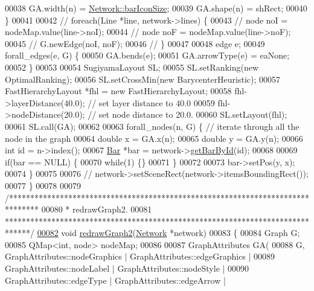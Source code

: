 \begin{DoxyCode}
00038     GA.width(n) = \hyperlink{group___graphics_gaa334bbc93b3fde219840e95e23198b53}{Network::barIconSize};
00039     GA.shape(n) = shRect;
00040   \}
00041 
00042 \textcolor{comment}{//  foreach(Line *line, network->lines) \{}
00043 \textcolor{comment}{//    node noI = nodeMap.value(line->noI);}
00044 \textcolor{comment}{//    node noF = nodeMap.value(line->noF);}
00045 \textcolor{comment}{//    G.newEdge(noI, noF);}
00046 \textcolor{comment}{//  \}}
00047 
00048   edge e;
00049   forall\_edges(e, G) \{
00050     GA.bends(e);
00051     GA.arrowType(e) = eaNone;
00052   \}
00053 
00054   SugiyamaLayout SL;
00055   SL.setRanking(\textcolor{keyword}{new} OptimalRanking);
00056   SL.setCrossMin(\textcolor{keyword}{new} BarycenterHeuristic);
00057   FastHierarchyLayout *fhl = \textcolor{keyword}{new} FastHierarchyLayout;
00058   fhl->layerDistance(40.0);    \textcolor{comment}{// set layer distance to 40.0}
00059   fhl->nodeDistance(20.0); \textcolor{comment}{// set node distance to 20.0.}
00060   SL.setLayout(fhl);
00061   SL.call(GA);
00062 
00063   forall\_nodes(n, G) \{  \textcolor{comment}{// iterate through all the node in the graph}
00064     \textcolor{keywordtype}{double} x = GA.x(n);
00065     \textcolor{keywordtype}{double} y = GA.y(n);
00066     \textcolor{keywordtype}{int} \textcolor{keywordtype}{id} = n->index();
00067     \hyperlink{class_bar}{Bar} *bar = network->\hyperlink{group___graphics_ga9c5806f5a0d236bb6d8abbdce62d9675}{getBarById}(\textcolor{keywordtype}{id});
00068 
00069     \textcolor{keywordflow}{if}(bar == NULL) \{
00070       \textcolor{keywordflow}{while}(1) \{\}
00071     \}
00072 
00073     bar->setPos(y, x);
00074   \}
00075 
00076 \textcolor{comment}{//  network->setSceneRect(network->itemsBoundingRect());}
00077 \}
00078 
00079 \textcolor{comment}{/*******************************************************************************}
00080 \textcolor{comment}{ * redrawGraph2.}
00081 \textcolor{comment}{ ******************************************************************************/}
\hypertarget{redraw_8cpp_source_l00082}{}\hyperlink{redraw_8h_ad9c6f1e3f121ffdcbf70c98d31a442f0}{00082} \textcolor{keywordtype}{void} \hyperlink{redraw_8cpp_ad9c6f1e3f121ffdcbf70c98d31a442f0}{redrawGraph2}(\hyperlink{class_network}{Network} *network)
00083 \{
00084   Graph G;
00085   QMap<int, node> nodeMap;
00086 
00087   GraphAttributes GA(
00088     G, GraphAttributes::nodeGraphics | GraphAttributes::edgeGraphics |
00089     GraphAttributes::nodeLabel | GraphAttributes::nodeStyle |
00090     GraphAttributes::edgeType | GraphAttributes::edgeArrow |

\end{DoxyCode}
